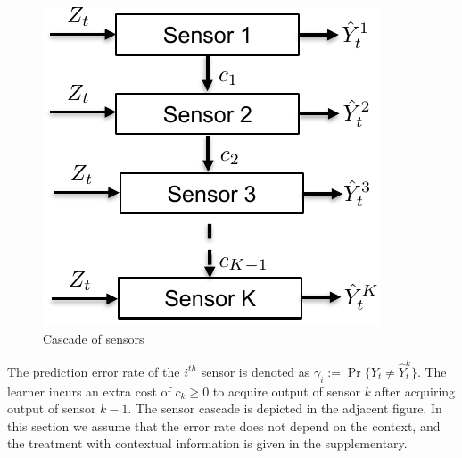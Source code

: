 \begin{figure}
	\vspace{-.5cm}
	\centering
	\includegraphics[scale=.6]{../Figures/SensorCascade.pdf}
	\caption{Cascade of sensors
	}\label{wrap-fig:1}
	\vspace{-.5cm}
\end{figure} 

The prediction error rate of the $i^{th}$ sensor is denoted as $\gamma_i:=\Pr\{Y_t\neq \hat{Y}^k_t\}$. The learner incurs an extra cost of $c_k\geq 0$ to acquire output of sensor $k$ after acquiring output of sensor $k-1$. The sensor cascade is depicted in the adjacent figure. In this section we assume that the error rate does not depend on the  context, and the treatment with contextual information is given in the supplementary. 
\fi

